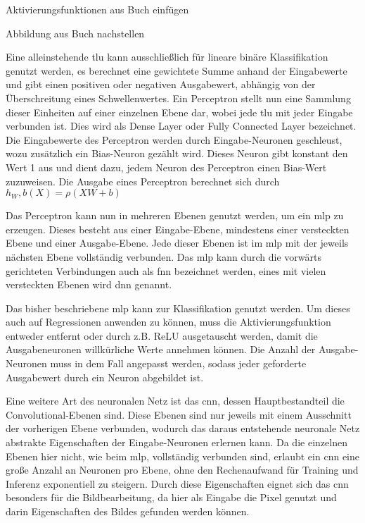 Aktivierungsfunktionen aus Buch einfügen

Abbildung aus Buch nachstellen

Eine alleinstehende \ac{tlu} kann ausschließlich für lineare binäre Klassifikation genutzt werden, es berechnet eine gewichtete Summe anhand der Eingabewerte und gibt einen positiven oder negativen Ausgabewert, abhängig von der Überschreitung eines Schwellenwertes. Ein Perceptron stellt nun eine Sammlung dieser Einheiten auf einer einzelnen Ebene dar, wobei jede \ac{tlu} mit jeder Eingabe verbunden ist. Dies wird als Dense Layer oder Fully Connected Layer bezeichnet. Die Eingabewerte des Perceptron werden durch Eingabe-Neuronen geschleust, wozu zusätzlich ein Bias-Neuron gezählt wird. Dieses Neuron gibt konstant den Wert 1 aus und dient dazu, jedem Neuron des Perceptron einen Bias-Wert zuzuweisen. Die Ausgabe eines Perceptron berechnet sich durch \(h_W,b(X)=\rho(XW+b)\) \cite[vgl. S. 284 ff.]{Geron2019}

Das Perceptron kann nun in mehreren Ebenen genutzt werden, um ein \ac{mlp} zu erzeugen. Dieses besteht aus einer Eingabe-Ebene, mindestens einer versteckten Ebene und einer Ausgabe-Ebene. Jede dieser Ebenen ist im \ac{mlp} mit der jeweils nächsten Ebene vollständig verbunden. Das \ac{mlp} kann durch die vorwärts gerichteten Verbindungen auch als \ac{fnn} bezeichnet werden, eines mit vielen versteckten Ebenen wird \ac{dnn} genannt. \cite[vgl. S. 284 ff.]{Geron2019}

Das bisher beschriebene \ac{mlp} kann zur Klassifikation genutzt werden. Um dieses auch auf Regressionen anwenden zu können, muss die Aktivierungsfunktion entweder entfernt oder durch z.B. ReLU ausgetauscht werden, damit die Ausgabeneuronen willkürliche Werte annehmen können. Die Anzahl der Ausgabe-Neuronen muss in dem Fall angepasst werden, sodass jeder geforderte Ausgabewert durch ein Neuron abgebildet ist. \cite[vgl. S. 292 ff.]{Geron2019}

Eine weitere Art des neuronalen Netz ist das \ac{cnn}, dessen Hauptbestandteil die Convolutional-Ebenen sind. Diese Ebenen sind nur jeweils mit einem Ausschnitt der vorherigen Ebene verbunden, wodurch das daraus entstehende neuronale Netz abstrakte Eigenschaften der Eingabe-Neuronen erlernen kann. Da die einzelnen Ebenen hier nicht, wie beim \ac{mlp}, vollständig verbunden sind, erlaubt ein \ac{cnn} eine große Anzahl an Neuronen pro Ebene, ohne den Rechenaufwand für Training und Inferenz exponentiell zu steigern. Durch diese Eigenschaften eignet sich das \ac{cnn} besonders für die Bildbearbeitung, da hier als Eingabe die Pixel genutzt und darin Eigenschaften des Bildes gefunden werden können. \cite[vgl. S. 447 f.]{Geron2019}

